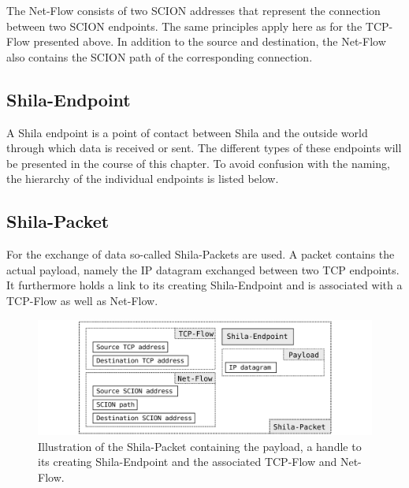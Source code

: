 The Net-Flow consists of two SCION addresses that represent the connection between two SCION endpoints. The same principles apply here as for the TCP-Flow presented above. In addition to the source and destination, the Net-Flow also contains the SCION path of the corresponding connection.

\subsection{Shila-Endpoint}

A Shila endpoint is a point of contact between Shila and the outside world through which data is received or sent. The different types of these endpoints will be presented in the course of this chapter. To avoid confusion with the naming, the hierarchy of the individual endpoints is listed below.
\\

\subsection{Shila-Packet}

For the exchange of data so-called Shila-Packets are used. A packet contains the actual payload, namely the IP datagram exchanged between two TCP endpoints. It furthermore holds a link to its creating Shila-Endpoint and is associated with a TCP-Flow as well as Net-Flow. 

\begin{figure}[H]
	\begin{center}
		\def\svgwidth{1\textwidth}
		\includegraphics[scale=0.2]{../illustrations/implementation/ShilaPacket.pdf}   
		\caption[Caption for the list of figures.]{Illustration of the Shila-Packet containing the payload, a handle to its creating Shila-Endpoint and the associated TCP-Flow and Net-Flow.}
		\label{fig:IllustrationShilaPacket}
	\end{center}
\end{figure}

